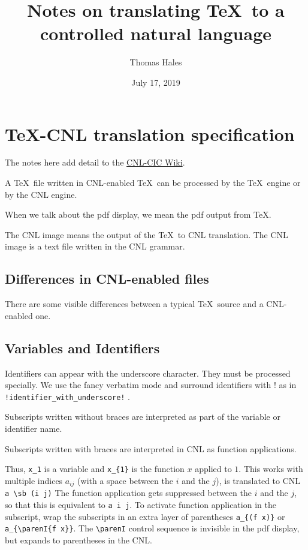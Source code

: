 \documentclass[12pt]{amsart}
\title{Notes on translating \TeX\ to a controlled natural language}
\date{July 17, 2019}                                           %
\author{Thomas Hales}
\begin{document}
\maketitle



\section{\TeX-CNL translation specification}

The notes here add detail to the
 \href{https://github.com/formalabstracts/CNL-CIC/wiki/Conversion-from-LaTeX}{CNL-CIC Wiki}.

A \TeX\ file written in CNL-enabled \TeX\ can be processed 
by the \TeX\ engine or by the CNL engine.


When
we talk about the pdf display, we mean the pdf output 
from \TeX.

The CNL image
means the output of the \TeX\ to CNL translation.  The CNL image is a
text file written in the CNL grammar.


\subsection{Differences in CNL-enabled files}

There are some visible differences between a typical \TeX\ source
and a CNL-enabled one.

\subsection{Variables and Identifiers}

Identifiers can appear with the underscore character.  They must be
processed specially.   We use the fancy verbatim mode and surround
identifiers with ! as in \verb'!identifier_with_underscore!' .

Subscripts written without braces are interpreted as part of the variable
or identifier name.



Subscripts written with braces are interpreted in CNL as function applications.

Thus, \verb!x_1! is a variable and  \verb!x_{1}!  is the function $x$ applied to $1$.
This works with multiple indices $a_{i j}$ (with a space between the $i$ and the $j$),
is translated to CNL \verb!a \sb (i j)!  The function application gets suppressed between
the $i$ and the $j$, so that this is equivalent to \verb!a i j!.   To activate function application
in the subscript, wrap the subscripts in an extra layer of parentheses \verb!a_{(f x)}! or
\verb!a_{\parenI{f x}}!.  The \verb!\parenI! control sequence is invisible in the pdf display,
but expands to parentheses in the CNL.
\end{document}
